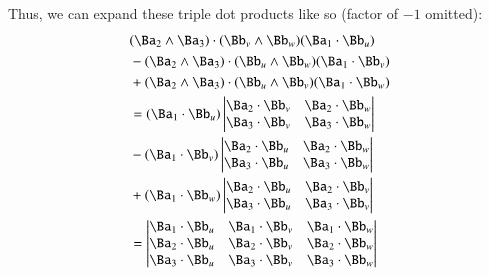 Thus, we can expand these triple dot products like so (factor of $-1$ omitted):
\begin{align*}
&(\Ba_2 \wedge \Ba_3) \cdot (\Bb_v \wedge \Bb_w) (\Ba_1 \cdot \Bb_u) \\
&-(\Ba_2 \wedge \Ba_3) \cdot (\Bb_u \wedge \Bb_w) (\Ba_1 \cdot \Bb_v) \\
&+(\Ba_2 \wedge \Ba_3) \cdot (\Bb_u \wedge \Bb_v) (\Ba_1 \cdot \Bb_w)  \\
&=
(\Ba_1 \cdot \Bb_u) 
\begin{vmatrix}
\Ba_2 \cdot \Bb_v & \Ba_2 \cdot \Bb_w \\
\Ba_3 \cdot \Bb_v & \Ba_3 \cdot \Bb_w \\
\end{vmatrix} \\
&-
(\Ba_1 \cdot \Bb_v) 
\begin{vmatrix}
\Ba_2 \cdot \Bb_u & \Ba_2 \cdot \Bb_w \\
\Ba_3 \cdot \Bb_u & \Ba_3 \cdot \Bb_w \\
\end{vmatrix} \\
&+
(\Ba_1 \cdot \Bb_w) 
\begin{vmatrix}
\Ba_2 \cdot \Bb_u & \Ba_2 \cdot \Bb_v \\
\Ba_3 \cdot \Bb_u & \Ba_3 \cdot \Bb_v \\
\end{vmatrix} \\
&=
\begin{vmatrix}
\Ba_1 \cdot \Bb_u & \Ba_1 \cdot \Bb_v & \Ba_1 \cdot \Bb_w \\
\Ba_2 \cdot \Bb_u & \Ba_2 \cdot \Bb_v & \Ba_2 \cdot \Bb_w \\
\Ba_3 \cdot \Bb_u & \Ba_3 \cdot \Bb_v & \Ba_3 \cdot \Bb_w \\
\end{vmatrix} \\
\end{align*}

